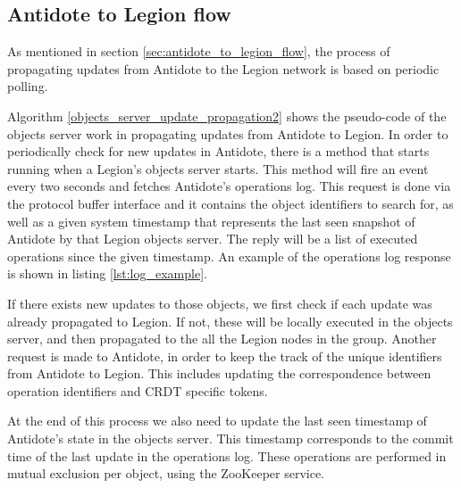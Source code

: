 \subsection{Antidote to Legion flow}
\label{sec:legion_changes_antidote to legion flow}
As mentioned in section \ref{sec:antidote_to_legion_flow}, the process of propagating updates from Antidote to the Legion network is based on periodic polling.\par
	Algorithm \ref{objects_server_update_propagation2} shows the pseudo-code of the objects server work in propagating updates from Antidote to Legion. In order to periodically check for new updates in Antidote, there is a method that starts running when a Legion's objects server starts. This method will fire an event every two seconds and fetches Antidote's operations log. This request is done via the protocol buffer interface and it contains the object identifiers to search for, as well as a given system timestamp that represents the last seen snapshot of Antidote by that Legion objects server. The reply will be a list of executed operations since the given timestamp. An example of the operations log response is shown in listing \ref{lst:log_example}.\par
	If there exists new updates to those objects, we first check if each update was already propagated to Legion. If not, these will be locally executed in the objects server, and then propagated to the all the Legion nodes in the group. Another request is made to Antidote, in order to keep the track of the unique identifiers from Antidote to Legion. This includes updating the correspondence between operation identifiers and CRDT specific tokens.\par
	At the end of this process we also need to update the last seen timestamp of Antidote's state in the objects server. This timestamp corresponds to the commit time of the last update in the operations log. These operations are performed in mutual exclusion per object, using the ZooKeeper service.
	
